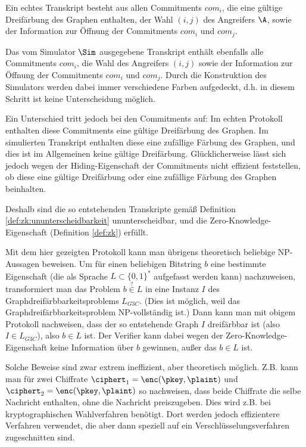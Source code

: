Ein echtes Transkript besteht aus allen Commitments $com_i$, die eine
gültige Dreifärbung des Graphen enthalten, der Wahl $(i,j)$ des
Angreifers $\A$, sowie der Information zur Öffnung der Commitments
$com_i$ und $com_j$.

Das vom Simulator $\Sim$ ausgegebene Transkript enthält ebenfalls alle
Commitments $com_i$, die Wahl des Angreifers $(i,j)$ sowie der
Information zur Öffnung der Commitments $com_i$ und $com_j$. Durch die
Konstruktion des Simulators werden dabei immer verschiedene Farben
aufgedeckt, d.h. in diesem Schritt ist keine Unterscheidung möglich.

Ein Unterschied tritt jedoch bei den Commitments auf: Im echten
Protokoll enthalten diese Commitments eine gültige Dreifärbung des
Graphen. Im simulierten Transkript enthalten diese eine zufällige
Färbung des Graphen, und dies ist im Allgemeinen keine gültige
Dreifärbung.  Glücklicherweise lässt sich jedoch wegen der
Hiding-Eigenschaft der Commitments nicht effizient feststellen, ob diese
eine gültige Dreifärbung oder eine zufällige Färbung des Graphen
beinhalten.

Deshalb sind die so entstehenden Transkripte gemäß Definition
\ref{def:zk:ununterscheidbarkeit} ununterscheidbar, und die
Zero-Knowledge-Eigenschaft (Definition \ref{def:zk}) erfüllt.

Mit dem hier gezeigten Protokoll kann man übrigens theoretisch beliebige
NP-Aussagen beweisen.  Um für einen beliebigen Bitstring $b$ eine
bestimmte Eigenschaft (die als Sprache $L \subset \{0,1\}^*$ aufgefasst
werden kann) nachzuweisen, transformiert man das Problem $b
\stackrel{?}{\in} L$ in eine Instanz $I$ des
Graphdreifärbbarkeitsproblems $L_{G3C}$.  (Dies ist möglich, weil das
Graphdreifärbbarkeitsproblem NP-vollständig ist.)  Dann kann man mit
obigem Protokoll nachweisen, dass der so entstehende Graph $I$
dreifärbbar ist (also $I \in L_{G3C}$), also $b \in L$ ist.  Der
Verifier kann dabei wegen der Zero-Knowledge-Eigenschaft keine
Information über $b$ gewinnen, außer das $b \in L$ ist.

Solche Beweise sind zwar extrem ineffizient, aber theoretisch möglich.
Z.B. kann man für zwei Chiffrate $\ciphert_1 = \enc(\pkey, \plaint)$ und
$\ciphert_2 = \enc(\pkey, \plaint)$ so nachweisen, dass beide Chiffrate
die selbe Nachricht enthalten, ohne die Nachricht preiszugeben.  Dies
wird z.B. bei kryptographischen Wahlverfahren benötigt.  Dort werden
jedoch effizientere Verfahren verwendet, die aber dann speziell auf ein
Verschlüsselungsverfahren zugeschnitten sind.

